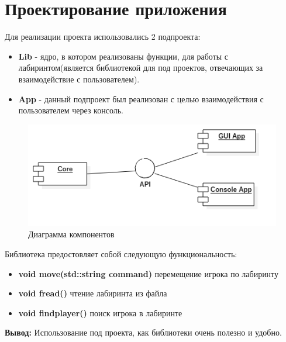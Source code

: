 \documentclass[a4paper]{article}
\begin{document}
	
	
\section{Проектирование приложения}

Для реализации проекта использовались 2 подпроекта:

\begin{itemize}
	\item \textbf{Lib} - ядро, в котором реализованы функции, для работы с лабиринтом(является библиотекой для под проектов, отвечающих за взаимодействие с пользователем).
	\item \textbf{App} - данный подпроект был реализован с целью взаимодействия с пользователем через консоль.
\end{itemize}

\begin{figure}[H]
	\begin{center}
		\includegraphics[scale=0.45]{Component.png}
		\caption{Диаграмма компонентов} 
		\label{pic:pic_name} %
	\end{center}
\end{figure}

Библиотека предостовляет собой следующую функциональность:
\begin{itemize}

    \item\textbf{void move(std::string command)} 
    перемещение игрока по лабиринту

    \item\textbf{void fread()} 
    чтение лабиринта из файла

    \item\textbf{void findplayer()} 
    поиск игрока в лабиринте

    
\end{itemize}

	\textbf{Вывод:} Использование под проекта, как библиотеки очень полезно и удобно. 
\end{document}
